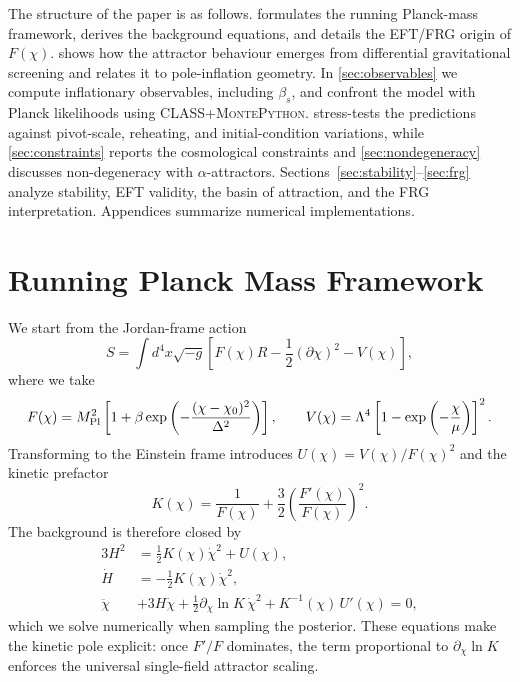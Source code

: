 \documentclass[11pt,a4paper]{article}
\begin{document}
The structure of the paper is as follows.  formulates the running Planck-mass framework, derives the background equations, and details the EFT/FRG origin of $F(\chi)$.  shows how the attractor behaviour emerges from differential gravitational screening and relates it to pole-inflation geometry. In \cref{sec:observables} we compute inflationary observables, including $\beta_s$, and confront the model with Planck likelihoods using \textsc{CLASS}+\textsc{MontePython}.  stress-tests the predictions against pivot-scale, reheating, and initial-condition variations, while \cref{sec:constraints} reports the cosmological constraints and \cref{sec:nondegeneracy} discusses non-degeneracy with $\alpha$-attractors. Sections~\ref{sec:stability}--\ref{sec:frg} analyze stability, EFT validity, the basin of attraction, and the FRG interpretation. Appendices summarize numerical implementations.

\section{Running Planck Mass Framework}
\label{sec:framework}
We start from the Jordan-frame action
\begin{equation}
S=\int d^{4}x\sqrt{-g}\left[ F(\chi)R-\frac{1}{2}(\partial\chi)^2-V(\chi) \right],
\end{equation}
where we take
\begin{equation}
F(\chi)=M_{\rm Pl}^{2}\left[1+\beta\exp\left(-\frac{(\chi-\chi_{0})^{2}}{\Delta^{2}}\right)\right], \qquad V(\chi)=\Lambda^{4}\left[1-\exp\left(-\frac{\chi}{\mu}\right)\right]^{2}.
\end{equation}
Transforming to the Einstein frame introduces $U(\chi)=V(\chi)/F(\chi)^{2}$ and the kinetic prefactor
\begin{equation}
K(\chi)=\frac{1}{F(\chi)}+\frac{3}{2}\left(\frac{F'(\chi)}{F(\chi)}\right)^{2}.
\end{equation}
The background is therefore closed by
\begin{align}
3H^{2} &= \frac{1}{2}K(\chi)\dot{\chi}^{2}+U(\chi), \label{eq:friedmann}\\
\dot{H} &= -\frac{1}{2}K(\chi)\dot{\chi}^{2}, \label{eq:raychaudhuri}\\
\ddot{\chi} &+3H\dot{\chi}+\frac{1}{2}\partial_{\chi}\ln K\,\dot{\chi}^{2}+K^{-1}(\chi)\,U'(\chi)=0, \label{eq:field}
\end{align}
which we solve numerically when sampling the posterior. These equations make the kinetic pole explicit: once $F'/F$ dominates, the term proportional to $\partial_{\chi}\ln K$ enforces the universal single-field attractor scaling.
\end{document}
